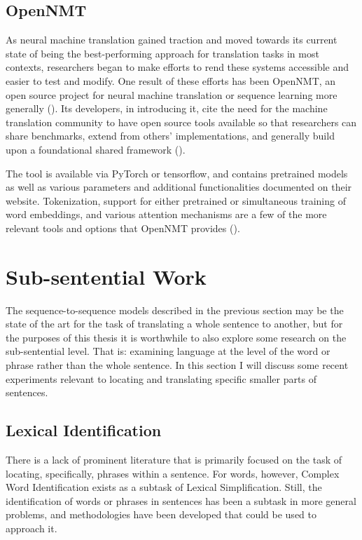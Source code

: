 \subsection{OpenNMT} \label{opennmt}

As neural machine translation gained traction and moved towards its current state of being the best-performing approach for translation tasks in most contexts, researchers began to make efforts to rend these systems accessible and easier to test and modify. One result of these efforts has been OpenNMT, an open source project for neural machine translation or sequence learning more generally (\cite{2017opennmt}). Its developers, in introducing it, cite the need for the machine translation community to have open source tools available so that researchers can share benchmarks, extend from others' implementations, and generally build upon a foundational shared framework (\cite{2017opennmt}).

The tool is available via PyTorch or tensorflow, and contains pretrained models as well as various parameters and additional functionalities documented on their website. Tokenization, support for either pretrained or simultaneous training of word embeddings, and various attention mechanisms are a few of the more relevant tools and options that OpenNMT provides (\cite{2017opennmt}).

\section{Sub-sentential Work}

The sequence-to-sequence models described in the previous section may be the state of the art for the task of translating a whole sentence to another, but for the purposes of this thesis it is worthwhile to also explore some research on the sub-sentential level. That is: examining language at the level of the word or phrase rather than the whole sentence. In this section I will discuss some recent experiments relevant to locating and translating specific smaller parts of sentences.

\subsection{Lexical Identification}

There is a lack of prominent literature that is primarily focused on the task of locating, specifically, phrases within a sentence. For words, however, Complex Word Identification exists as a subtask of Lexical Simplification. Still, the identification of words or phrases in sentences has been a subtask in more general problems, and methodologies have been developed that could be used to approach it.

